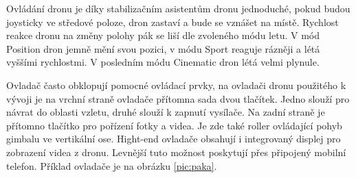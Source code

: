 Ovládání dronu je díky stabilizačním asistentům dronu jednoduché, pokud budou joysticky ve středové poloze, dron zastaví a bude se vznášet na místě. Rychlost reakce dronu na změny polohy pák se liší dle zvoleného módu letu. V mód Position dron jemně mění svou pozici, v módu Sport reaguje rázněji a létá vyššími rychlostmi. V posledním módu Cinematic dron létá velmi plynule.

Ovladač často obklopují pomocné ovládací prvky, na ovladači dronu použitého k vývoji je na vrchní straně ovladače přítomna sada dvou tlačítek. Jedno slouží pro návrat do oblasti vzletu, druhé slouží k zapnutí vysílače. Na zadní straně je přítomno tlačítko pro pořízení fotky a videa. Je zde také roller ovládající pohyb gimbalu ve vertikální ose. Hight-end ovladače obsahují i integrovaný displej pro zobrazení videa z dronu. Levnější tuto možnost poskytují přes připojený mobilní telefon. Příklad ovladače je na obrázku \ref{pic:paka}.
